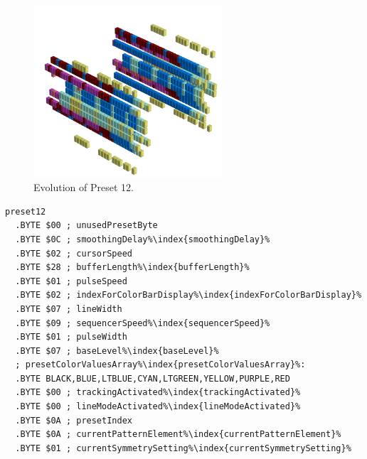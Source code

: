 \vspace*{-0.7cm}
\begin{minipage}[b]{0.48\linewidth}


                                                                 
\begin{figure}[H]                                                          
  \centering                                                             
  \begin{adjustbox}{width=7cm,center}                                   
  \includegraphics[width=7cm]{src/presets/pattern12-45.png}%
  \end{adjustbox}                                                        
\caption{Evolution of Preset 12.}                                           
\end{figure}                                                               
                                                                 
                                                                           
\end{minipage}
\hspace{0.1cm}
\begin{minipage}[b]{0.48\linewidth}                                       
\begin{lstlisting}[basicstyle=\ttfamily\scriptsize,caption=Data structure for Preset 12.,escapechar=\%]
preset12
  .BYTE $00 ; unusedPresetByte
  .BYTE $0C ; smoothingDelay%\index{smoothingDelay}%
  .BYTE $02 ; cursorSpeed
  .BYTE $28 ; bufferLength%\index{bufferLength}%
  .BYTE $01 ; pulseSpeed
  .BYTE $02 ; indexForColorBarDisplay%\index{indexForColorBarDisplay}%
  .BYTE $07 ; lineWidth
  .BYTE $09 ; sequencerSpeed%\index{sequencerSpeed}%
  .BYTE $01 ; pulseWidth
  .BYTE $07 ; baseLevel%\index{baseLevel}%
  ; presetColorValuesArray%\index{presetColorValuesArray}%: 
  .BYTE BLACK,BLUE,LTBLUE,CYAN,LTGREEN,YELLOW,PURPLE,RED
  .BYTE $00 ; trackingActivated%\index{trackingActivated}%
  .BYTE $00 ; lineModeActivated%\index{lineModeActivated}%
  .BYTE $0A ; presetIndex
  .BYTE $0A ; currentPatternElement%\index{currentPatternElement}%
  .BYTE $01 ; currentSymmetrySetting%\index{currentSymmetrySetting}%
\end{lstlisting}
\end{minipage}

